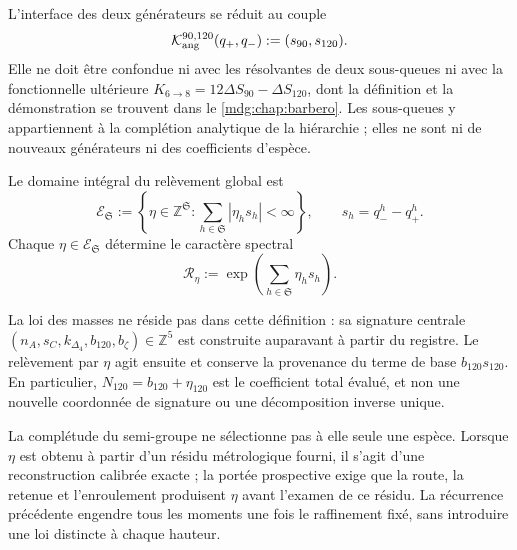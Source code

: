 L'interface des deux générateurs se réduit au couple
\[
 \mathcal K_{\rm ang}^{90,120}(q_+,q_-):=(s_{90},s_{120}).
\]
Elle ne doit être confondue ni avec les résolvantes de deux sous-queues ni avec la fonctionnelle ultérieure \(K_{6\to8}=12\Delta S_{90}-\Delta S_{120}\), dont la définition et la démonstration se trouvent dans le \cref{mdg:chap:barbero}. Les sous-queues y appartiennent à la complétion analytique de la hiérarchie ; elles ne sont ni de nouveaux générateurs ni des coefficients d'espèce.

\begin{definition}
\label{def:modulo-refinamientos-torre-rev7} Le domaine intégral du relèvement global est
\[
 \mathcal E_{\mathfrak S}
 :=\left\{\eta\in\mathbb Z^{\mathfrak S}:
 \sum_{h\in\mathfrak S}|\eta_hs_h|<\infty\right\},
 \qquad s_h=q_-^h-q_+^h.
\]
Chaque \(\eta\in\mathcal E_{\mathfrak S}\) détermine le caractère spectral
\[
 \mathcal R_\eta
 :=\exp\!\left(\sum_{h\in\mathfrak S}\eta_hs_h\right).
\]
\end{definition}

La loi des masses ne réside pas dans cette définition : sa signature centrale \((n_A,s_C,k_{\Delta_4},b_{120},b_\zeta)\in\mathbb Z^5\) est construite auparavant à partir du registre. Le relèvement par \(\eta\) agit ensuite et conserve la provenance du terme de base \(b_{120}s_{120}\). En particulier, \(N_{120}=b_{120}+\eta_{120}\) est le coefficient total évalué, et non une nouvelle coordonnée de signature ou une décomposition inverse unique.

La complétude du semi-groupe ne sélectionne pas à elle seule une espèce. Lorsque \(\eta\) est obtenu à partir d'un résidu métrologique fourni, il s'agit d'une reconstruction calibrée exacte ; la portée prospective exige que la route, la retenue et l'enroulement produisent \(\eta\) avant l'examen de ce résidu. La récurrence précédente engendre tous les moments une fois le raffinement fixé, sans introduire une loi distincte à chaque hauteur.
